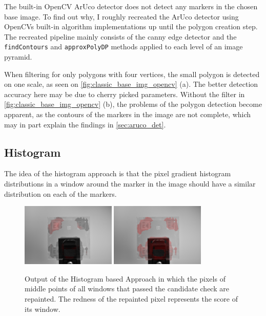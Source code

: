 \documentclass[10pt]{book}
\newcommand{\figurereft}[2]{\autoref{#1} #2}
\begin{document}
The built-in \ac{OpenCV} \ac{ArUco} detector does not detect any markers in the chosen base image. To find out why, I roughly recreated the \ac{ArUco} detector using \acp{OpenCV} built-in algorithm implementations up until the polygon creation step. The recreated pipeline mainly consists of the canny edge detector and the \texttt{findContours} and \texttt{approxPolyDP} methods applied to each level of an image pyramid. 

When filtering for only polygons with four vertices, the small polygon is detected on one scale, as seen on \figurereft{fig:classic_base_img_opencv}{(a)}. The better detection accuracy here may be due to cherry picked parameters. Without the filter in \figurereft{fig:classic_base_img_opencv}{(b)}, the problems of the polygon detection become apparent, as the contours of the markers in the image are not complete, which may in part explain the findings in \autoref{sec:aruco_det}.

\subsection{Histogram}

The idea of the histogram approach is that the pixel gradient histogram distributions in a window around the marker in the image should have a similar distribution on each of the markers.

\begin{figure}
  \centering
     {\includegraphics[width=0.4\textwidth]{image/classic_hist_markerynesses}}
     {\includegraphics[width=0.4\textwidth]{image/classic_markeryness}}
  \caption{Output of the Histogram based Approach in which the pixels of middle points of all windows that passed the candidate check are repainted. The redness of the repainted pixel represents the score of its window.}
  \label{fig:markeryness_scores}
\end{figure}
\end{document}
